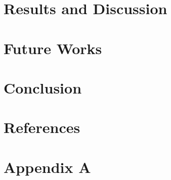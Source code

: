 \documentclass[12pt]{article}
\begin{document}
\section{Results and Discussion}  \label{s:rd}
\section{Future Works}\label{s:fw}
\section{Conclusion}  \label{s:con}
\section*{References} \label{s:ref}
\section*{Appendix A} \label{app:A}
\end{document}
